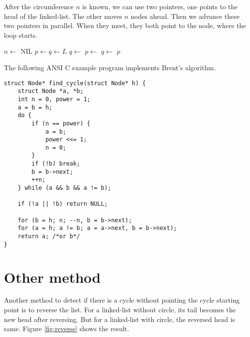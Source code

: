 \documentclass{article}
\begin{document}
After the circumference $n$ is known, we can use two pointers, one points to the head
of the linked-list. The other moves $n$ nodes ahead. Then we advance these two pointers
in parallel. When they meet, they both point to the node, where the loop starts.

\begin{algorithmic}[1]
  \State $n \gets$ 
    \State \Return NIL
  \EndIf
  \State $p \gets q \gets L$
    \State $q \gets$ 
  \EndLoop
    \State $p \gets$ 
    \State $q \gets$ 
  \EndWhile
  \State \Return $p$ 
\EndFunction
\end{algorithmic}

The following ANSI C example program implements Brent's algorithm.

\lstset{language=C}
\begin{lstlisting}
struct Node* find_cycle(struct Node* h) {
    struct Node *a, *b;
    int n = 0, power = 1;
    a = b = h;
    do {
        if (n == power) {
            a = b;
            power <<= 1;
            n = 0;
        }
        if (!b) break;
        b = b->next;
        ++n;
    } while (a && b && a != b);

    if (!a || !b) return NULL;

    for (b = h; n; --n, b = b->next);
    for (a = h; a != b; a = a->next, b = b->next);
    return a; /*or b*/
}
\end{lstlisting}

\section*{Other method}
Another method to detect if there is a cycle without pointing the cycle starting point is to reverse
the list. For a linked-list without circle, its tail becomes the new head after reversing. But
for a linked-list with circle, the reversed head is same. Figure \ref{fig:reverse} shows the result.
\end{document}
